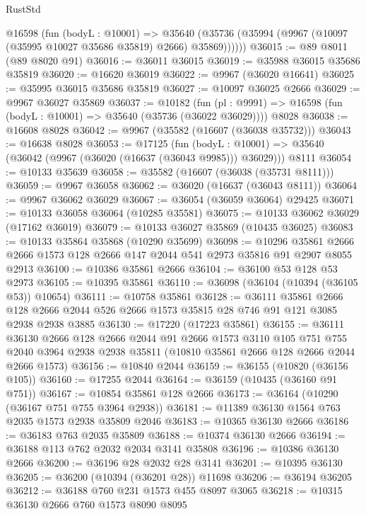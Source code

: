 \begin{lexlean}{RustStd}
\begin{coremodule}
      @16598
        (fun (bodyL : @10001) =>
        @35640 (@35736 (@35994 (@9967 (@10097 (@35995 @10027 @35686 @35819) @2666) @35869))))))
@36015 := @89 @8011 (@89 @8020 @91)
@36016 := @36011 @36015
@36019 := @35988 @36015 @35686 @35819
@36020 := @16620 @36019
@36022 := @9967 (@36020 @16641)
@36025 := @35995 @36015 @35686 @35819
@36027 := @10097 @36025 @2666
@36029 := @9967 @36027 @35869
@36037 := @10182
    (fun (pl : @9991) => @16598 (fun (bodyL : @10001) => @35640 (@35736 (@36022 @36029))))
    @8028
@36038 := @16608 @8028
@36042 := @9967 (@35582 (@16607 (@36038 @35732)))
@36043 := @16638 @8028
@36053 := @17125
    (fun (bodyL : @10001) => @35640 (@36042 (@9967 (@36020 (@16637 (@36043 @9985))) @36029)))
    @8111
@36054 := @10133 @35639
@36058 := @35582 (@16607 (@36038 (@35731 @8111)))
@36059 := @9967 @36058
@36062 := @36020 (@16637 (@36043 @8111))
@36064 := @9967 @36062 @36029
@36067 := @36054 (@36059 @36064) @29425
@36071 := @10133 @36058 @36064 (@10285 @35581)
@36075 := @10133 @36062 @36029 (@17162 @36019)
@36079 := @10133 @36027 @35869 (@10435 @36025)
@36083 := @10133 @35864 @35868 (@10290 @35699)
@36098 := @10296
    @35861
    @2666
    @2666
    @1573
    @128
    @2666
    @147
    @2044
    @541
    @2973
    @35816
    @91
    @2907
    @8055
    @2913
@36100 := @10386 @35861 @2666
@36104 := @36100 @53 @128 @53 @2973
@36105 := @10395 @35861
@36110 := @36098 (@36104 (@10394 (@36105 @53)) @10654)
@36111 := @10758 @35861
@36128 := @36111
    @35861
    @2666
    @128
    @2666
    @2044
    @526
    @2666
    @1573
    @35815
    @28
    @746
    @91
    @121
    @3085
    @2938
    @2938
    @3885
@36130 := @17220 (@17223 @35861)
@36155 := @36111
    @36130
    @2666
    @128
    @2666
    @2044
    @91
    @2666
    @1573
    @3110
    @105
    @751
    @755
    @2040
    @3964
    @2938
    @2938
    @35811
    (@10810 @35861 @2666 @128 @2666 @2044 @2666 @1573)
@36156 := @10840 @2044
@36159 := @36155 (@10820 (@36156 @105))
@36160 := @17255 @2044
@36164 := @36159 (@10435 (@36160 @91 @751))
@36167 := @10854 @35861 @128 @2666
@36173 := @36164 (@10290 (@36167 @751 @755 @3964 @2938))
@36181 := @11389 @36130 @1564 @763 @2035 @1573 @2938 @35809 @2046
@36183 := @10365 @36130 @2666
@36186 := @36183 @763 @2035 @35809
@36188 := @10374 @36130 @2666
@36194 := @36188 @113 @762 @2032 @2034 @3141 @35808
@36196 := @10386 @36130 @2666
@36200 := @36196 @28 @2032 @28 @3141
@36201 := @10395 @36130
@36205 := @36200 (@10394 (@36201 @28)) @11698
@36206 := @36194 @36205
@36212 := @36188 @760 @231 @1573 @455 @8097 @3065
@36218 := @10315 @36130 @2666 @760 @1573 @8090 @8095

\end{coremodule}
\end{lexlean}
